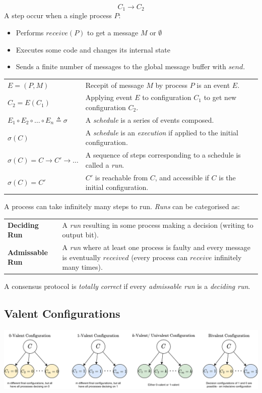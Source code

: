 \[C_1 \to C_2\]
A step occur when a single process $P$:
\begin{itemize}
    \item Performs $receive(P)$ to get a message $M$ or $\emptyset$
    \item Executes some code and changes its internal state
    \item Sends a finite number of messages to the global message buffer with $send$.
\end{itemize}
\begin{center}
    \begin{tabular}{l p{}}
        $E = (P,M)$ & Recepit of message $M$ by process $P$ is an event $E$. \\
        $C_2 = E(C_1)$ & Applying event $E$ to configuration $C_1$ to get new configuration $C_2$. \\
        $E_1 \circ E_2 \circ \dots \circ E_n \triangleq \sigma$ & A \textit{schedule} is a series of events composed. \\
        $\sigma (C)$ & A \textit{schedule} is an \textit{execution} if applied to the initial configuration. \\
        $\sigma(C) = C \to C' \to \dots$ & A sequence of steps corresponding to a schedule is called a \textit{run}. \\
        $\sigma(C) = C'$ & $C'$ is reachable from $C$, and accessible if $C$ is the initial configuration. \\
    \end{tabular}
\end{center}
A process can take infinitely many steps to run. \textit{Runs} can be categorised as:
\begin{center}
    \begin{tabular}{l p{}}
        \textbf{Deciding Run} & A \textit{run} resulting in some process making a decision (writing to output bit). \\
        \textbf{Admissable Run} & A \textit{run} where at least one process is faulty and every message is eventually $received$ (every process can $receive$ infinitely many times). \\
    \end{tabular}
\end{center}
A consensus protocol is \textit{totally correct} if every \textit{admissable run} is a \textit{deciding run}. 

\subsection{Valent Configurations}
\begin{center}
    \includegraphics[width=\textwidth]{consensus/images/valent_configurations.drawio.png}
\end{center}


